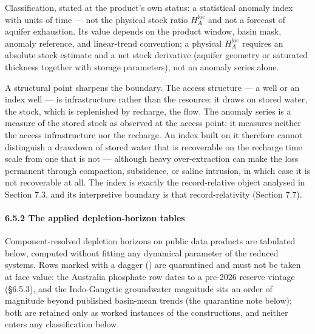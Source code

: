 \documentclass[11pt]{article}
\begin{document}
Classification, stated at the product's own status: a statistical
anomaly index with units of time --- not the physical stock ratio
\(H_A^{\mathrm{loc}}\) and not a forecast of aquifer exhaustion. Its
value depends on the product window, basin mask, anomaly reference, and
linear-trend convention; a physical \(H_A^{\mathrm{loc}}\) requires an
absolute stock estimate and a net stock derivative (aquifer geometry or
saturated thickness together with storage parameters), not an anomaly
series alone.

A structural point sharpens the boundary. The access structure --- a
well or an index well --- is infrastructure rather than the resource: it
draws on stored water, the stock, which is replenished by recharge, the
flow. The anomaly series is a measure of the stored stock as observed at
the access point; it measures neither the access infrastructure nor the
recharge. An index built on it therefore cannot distinguish a drawdown
of stored water that is recoverable on the recharge time scale from one
that is not --- although heavy over-extraction can make the loss
permanent through compaction, subsidence, or saline intrusion, in which
case it is not recoverable at all. The index is exactly the
record-relative object analysed in Section 7.3, and its interpretive
boundary is that record-relativity (Section 7.7).

\paragraph{6.5.2 The applied depletion-horizon
tables}\label{the-applied-depletion-horizon-tables}

Component-resolved depletion horizons on public data products are
tabulated below, computed without fitting any dynamical parameter of the
reduced systems. Rows marked with a dagger (\dag{}) are quarantined and must
not be taken at face value: the Australia phosphate row dates to a
pre-2026 reserve vintage (\S{}6.5.3), and the Indo-Gangetic groundwater
magnitude sits an order of magnitude beyond published basin-mean trends
(the quarantine note below); both are retained only as worked instances
of the constructions, and neither enters any classification below.
\end{document}
